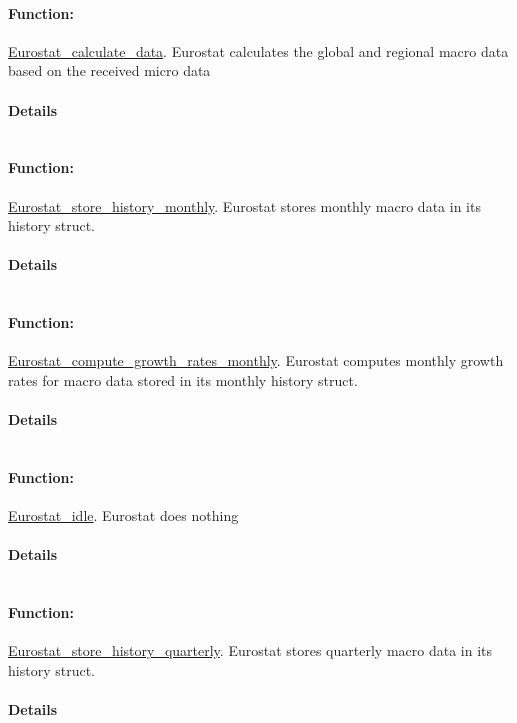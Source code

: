 \documentclass[a4paper,11pt]{article}
\begin{document}
\paragraph{Function:}\url{Eurostat_calculate_data}.
Eurostat calculates the global and regional macro data based on the received micro data
\paragraph{Details}
\begin{verbatim}
\end{verbatim}
\paragraph{Function:}\url{Eurostat_store_history_monthly}.
Eurostat stores monthly macro data in its history struct.
\paragraph{Details}
\begin{verbatim}
\end{verbatim}
\paragraph{Function:}\url{Eurostat_compute_growth_rates_monthly}.
Eurostat computes monthly growth rates for macro data stored in its monthly history struct.
\paragraph{Details}
\begin{verbatim}
\end{verbatim}
\paragraph{Function:}\url{Eurostat_idle}.
Eurostat does nothing
\paragraph{Details}
\begin{verbatim}
\end{verbatim}
\paragraph{Function:}\url{Eurostat_store_history_quarterly}.
Eurostat stores quarterly macro data in its history struct.
\paragraph{Details}
\begin{verbatim}
\end{verbatim}
\end{document}
